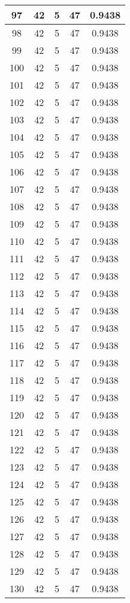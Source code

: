 \documentclass[letterpaper, 12pt]{article}
\begin{document}
\begin{longtable}{|c|c|c|c|c|}
\hline
97 & 42 & 5 & 47 & 0.9438 \\
\hline
98 & 42 & 5 & 47 & 0.9438 \\
\hline
99 & 42 & 5 & 47 & 0.9438 \\
\hline
100 & 42 & 5 & 47 & 0.9438 \\
\hline
101 & 42 & 5 & 47 & 0.9438 \\
\hline
102 & 42 & 5 & 47 & 0.9438 \\
\hline
103 & 42 & 5 & 47 & 0.9438 \\
\hline
104 & 42 & 5 & 47 & 0.9438 \\
\hline
105 & 42 & 5 & 47 & 0.9438 \\
\hline
106 & 42 & 5 & 47 & 0.9438 \\
\hline
107 & 42 & 5 & 47 & 0.9438 \\
\hline
108 & 42 & 5 & 47 & 0.9438 \\
\hline
109 & 42 & 5 & 47 & 0.9438 \\
\hline
110 & 42 & 5 & 47 & 0.9438 \\
\hline
111 & 42 & 5 & 47 & 0.9438 \\
\hline
112 & 42 & 5 & 47 & 0.9438 \\
\hline
113 & 42 & 5 & 47 & 0.9438 \\
\hline
114 & 42 & 5 & 47 & 0.9438 \\
\hline
115 & 42 & 5 & 47 & 0.9438 \\
\hline
116 & 42 & 5 & 47 & 0.9438 \\
\hline
117 & 42 & 5 & 47 & 0.9438 \\
\hline
118 & 42 & 5 & 47 & 0.9438 \\
\hline
119 & 42 & 5 & 47 & 0.9438 \\
\hline
120 & 42 & 5 & 47 & 0.9438 \\
\hline
121 & 42 & 5 & 47 & 0.9438 \\
\hline
122 & 42 & 5 & 47 & 0.9438 \\
\hline
123 & 42 & 5 & 47 & 0.9438 \\
\hline
124 & 42 & 5 & 47 & 0.9438 \\
\hline
125 & 42 & 5 & 47 & 0.9438 \\
\hline
126 & 42 & 5 & 47 & 0.9438 \\
\hline
127 & 42 & 5 & 47 & 0.9438 \\
\hline
128 & 42 & 5 & 47 & 0.9438 \\
\hline
129 & 42 & 5 & 47 & 0.9438 \\
\hline
130 & 42 & 5 & 47 & 0.9438 \\

\end{longtable}
\end{document}
